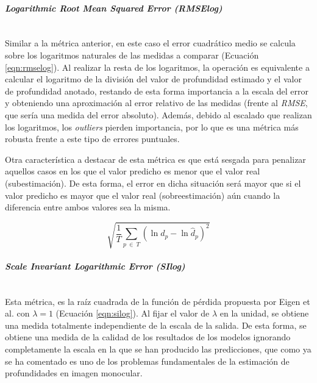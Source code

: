 \paragraph{\textit{Logarithmic Root Mean Squared Error (RMSElog)}}\mbox{}\\
Similar a la métrica anterior, en este caso el error cuadrático medio se calcula sobre los logaritmos naturales de las medidas a comparar (Ecuación \ref{eqn:rmselog}). Al realizar la resta de los logaritmos, la operación es equivalente a calcular el logaritmo de la división del valor de profundidad estimado y el valor de profundidad anotado, restando de esta forma importancia a la escala del error y obteniendo una aproximación al error relativo de las medidas (frente al \textit{RMSE}, que sería una medida del error absoluto). Además, debido al escalado que realizan los logaritmos, los \textit{outliers} pierden importancia, por lo que es una métrica más robusta frente a este tipo de errores puntuales.

Otra característica a destacar de esta métrica es que está sesgada para penalizar aquellos casos en los que el valor predicho es menor que el valor real (subestimación). De esta forma, el error en dicha situación será mayor que si el valor predicho es mayor que el valor real (sobreestimación) aún cuando la diferencia entre ambos valores sea la misma.

\begin{equation}
\label{eqn:rmselog}
\sqrt{\frac{1}{T}\sum_{p\ \in\ T} (\ln{d_p} - \ln{\hat{d}_p})^2}
\end{equation}

\paragraph{\textit{Scale Invariant Logarithmic Error (SIlog)}}\mbox{}\\
Esta métrica, es la raíz cuadrada de la función de pérdida propuesta por Eigen et al. \cite{eigen-multi-scale} con $\lambda = 1$ (Ecuación \ref{eqn:silog}). Al fijar el valor de $\lambda$ en la unidad, se obtiene una medida totalmente independiente de la escala de la salida. De esta forma, se obtiene una medida de la calidad de los resultados de los modelos ignorando completamente la escala en la que se han producido las predicciones, que como ya se ha comentado es uno de los problemas fundamentales de la estimación de profundidades en imagen monocular.

